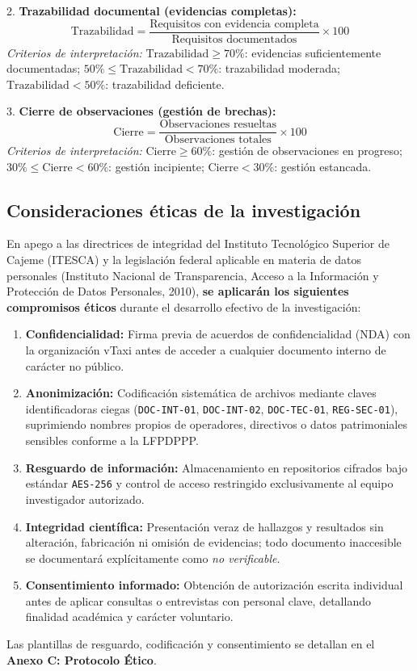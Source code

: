 {2. \textbf{Trazabilidad documental (evidencias completas):}
$$\text{Trazabilidad} = \frac{\text{Requisitos con evidencia completa}}{\text{Requisitos documentados}} \times 100$$
\textit{Criterios de interpretación:} $\text{Trazabilidad} \ge 70\%$: evidencias suficientemente documentadas; $50\% \le \text{Trazabilidad} < 70\%$: trazabilidad moderada; $\text{Trazabilidad} < 50\%$: trazabilidad deficiente.

3. \textbf{Cierre de observaciones (gestión de brechas):}
$$\text{Cierre} = \frac{\text{Observaciones resueltas}}{\text{Observaciones totales}} \times 100$$
\textit{Criterios de interpretación:} $\text{Cierre} \ge 60\%$: gestión de observaciones en progreso; $30\% \le \text{Cierre} < 60\%$: gestión incipiente; $\text{Cierre} < 30\%$: gestión estancada.

\subsection{Consideraciones éticas de la investigación}
En apego a las directrices de integridad del Instituto Tecnológico Superior de Cajeme (ITESCA) y la legislación federal aplicable en materia de datos personales (Instituto Nacional de Transparencia, Acceso a la Información y Protección de Datos Personales, 2010), \textbf{se aplicarán los siguientes compromisos éticos} durante el desarrollo efectivo de la investigación:
\begin{enumerate}
    \item \textbf{Confidencialidad:} Firma previa de acuerdos de confidencialidad (NDA) con la organización vTaxi antes de acceder a cualquier documento interno de carácter no público.
    \item \textbf{Anonimización:} Codificación sistemática de archivos mediante claves identificadoras ciegas (\texttt{DOC-INT-01}, \texttt{DOC-INT-02}, \texttt{DOC-TEC-01}, \texttt{REG-SEC-01}), suprimiendo nombres propios de operadores, directivos o datos patrimoniales sensibles conforme a la LFPDPPP.
    \item \textbf{Resguardo de información:} Almacenamiento en repositorios cifrados bajo estándar \texttt{AES-256} y control de acceso restringido exclusivamente al equipo investigador autorizado.
    \item \textbf{Integridad científica:} Presentación veraz de hallazgos y resultados sin alteración, fabricación ni omisión de evidencias; todo documento inaccesible se documentará explícitamente como \textit{no verificable}.
    \item \textbf{Consentimiento informado:} Obtención de autorización escrita individual antes de aplicar consultas o entrevistas con personal clave, detallando finalidad académica y carácter voluntario.
\end{enumerate}
Las plantillas de resguardo, codificación y consentimiento se detallan en el \textbf{Anexo C: Protocolo Ético}.

}
